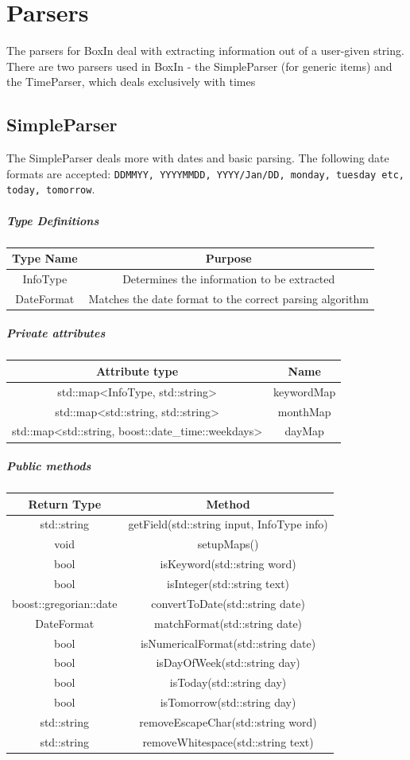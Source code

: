 \documentclass[12pt]{extarticle}
\begin{document}
\newpage

\section{Parsers}
The parsers for BoxIn deal with extracting information out of a user-given string. There are two parsers used in BoxIn - the SimpleParser (for generic items) and the TimeParser, which deals exclusively with times

\subsection{SimpleParser}
The SimpleParser deals more with dates and basic parsing. The following date formats are accepted: \texttt{DDMMYY, YYYYMMDD, YYYY/Jan/DD, monday, tuesday etc, today, tomorrow}.\\

\subparagraph{Type Definitions}
\begin{tabular}{c c}
Type Name & Purpose\\
\hline
InfoType & Determines the information to be extracted\\
DateFormat & Matches the date format to the correct parsing algorithm\\
\end{tabular}

\subparagraph{Private attributes}
\begin{tabular}{c c}
Attribute type & Name\\
\hline
std::map<InfoType, std::string> & keywordMap\\
std::map<std::string, std::string> & monthMap\\
std::map<std::string, boost::date\_time::weekdays> & dayMap\\
\end{tabular}

\subparagraph{Public methods}
\begin{tabular}{c c}
Return Type & Method\\
\hline
std::string & getField(std::string input, InfoType info)\\
void & setupMaps()\\
bool & isKeyword(std::string word)\\
bool & isInteger(std::string text)\\
boost::gregorian::date & convertToDate(std::string date)\\
DateFormat & matchFormat(std::string date)\\
bool & isNumericalFormat(std::string date)\\
bool & isDayOfWeek(std::string day)\\
bool & isToday(std::string day)\\
bool & isTomorrow(std::string day)\\
std::string & removeEscapeChar(std::string word)\\
std::string & removeWhitespace(std::string text)\\
\end{tabular}
\end{document}
